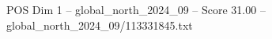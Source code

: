 \begin{textsample}{POS Dim 1 – global\_north\_2024\_09 – Score 31.00 – global\_north\_2024\_09/113331845.txt}
\end{textsample}
